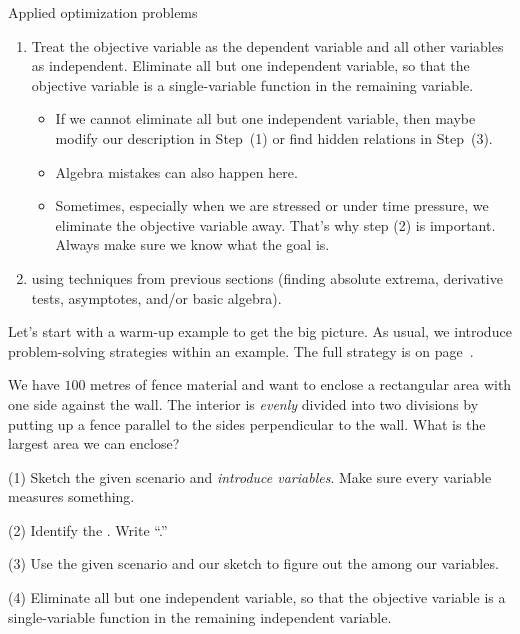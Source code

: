 \documentclass[../main.tex]{subfiles}
\begin{document}
\begin{lesson}{Applied optimization problems}
\begin{enumerate}[label=(\arabic*)]
    \item Treat the objective variable as the dependent variable and all other variables as independent. Eliminate all but one independent variable, so that the objective variable is a single-variable function in the remaining variable.

      \begin{itemize}
        \item If we cannot eliminate all but one independent variable, then maybe modify our description in Step~(1) or find hidden relations in Step~(3).
        \item Algebra mistakes can also happen here.
        \item Sometimes, especially when we are stressed or under time pressure, we eliminate the objective variable away. That's why step (2) is important. Always make sure we know what the goal is.
      \end{itemize}

    \item {} using techniques from previous sections (finding absolute extrema, derivative tests, asymptotes, and/or basic algebra).

  \end{enumerate}
  \clearpage

  Let's start with a warm-up example to get the big picture. As usual, we introduce problem-solving strategies within an example. The full strategy is on page~\pageref{page:optimization-strategy}.
  \begin{example} \label{ex:optimization-fence}
    We have \(100\) metres of fence material and want to enclose a rectangular area with one side against the wall. The interior is \emph{evenly} divided into two divisions by putting up a fence parallel to the sides perpendicular to the wall. What is the largest area we can enclose?

    (1) Sketch the given scenario and \emph{introduce variables}. Make sure every variable measures something.

    (2) Identify the . Write ``\emph{}.''

    (3) Use the given scenario and our sketch to figure out the  among our variables. 

    (4) Eliminate all but one independent variable, so that the objective variable is a single-variable function in the remaining independent variable. 


\end{example}
\end{lesson}
\end{document}
